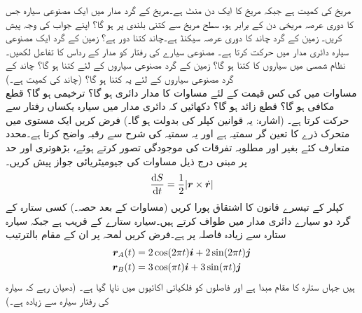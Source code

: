 مریخ کی کمیت  ہے  جبکہ مریخ کا ایک  دن  منٹ  ہے۔مریخ کے گرد مدار میں ایک مصنوعی سیارہ جس کا  دوری عرصہ مریخی دن کے برابر ہو، سطح مریخ سے کتنی بلندی پر ہو گا؟ اپنے جواب کی وجہ پیش کریں۔
زمین کے گرد چاند  کا دوری عرصہ  سیکنڈ  ہے۔چاند کتنا دور ہے؟
زمین کے گرد ایک مصنوعی سیارہ دائری مدار میں حرکت کرتا  ہے۔ مصنوعی سیارے کی رفتار کو مدار کے رداس کا تفاعل لکھیں۔
نظام شمسی میں سیاروں کا  کتنا ہو گا؟ زمین کے گرد مصنوعی سیاروں کے لئے کتنا ہو گا؟ چاند کے گرد مصنوعی سیاروں کے لئے یہ کتنا ہو گا؟ (چاند کی کمیت  ہے۔)
\\
مساوات  میں   کی کس قیمت کے لئے  مساوات  کا مدار دائری ہو گا؟ ترخیمی ہو گا؟ قطع مکافی ہو گا؟ قطع زائد ہو گا؟
دکھائیں کہ دائری مدار میں سیارہ یکساں رفتار سے حرکت کرتا ہے۔ (اشارہ: یہ قوانین کپلر کی بدولت ہو گا۔)
فرض کریں  ایک مستوی میں متحرک ذرے کا تعین گر سمتیہ  ہے اور  یہ  سمتیہ  کی شرح سے رقبہ واضح کرتا ہے۔محدد متعارف کئے بغیر اور مطلوبہ تفرقات  کی موجودگی تصور کرتے ہوئے، بڑھوتری اور حد  پر مبنی  درج ذیل مساوات کی  جیومیٹریائی جواز پیش کریں۔ 
\begin{align*}
\frac{\dif S}{\dif t}=\frac{1}{2}\abs{\kvec{r}\times \dot{\kvec{r}}}
\end{align*}
کپلر کے تیسرے قانون  کا اشتقاق  پورا کریں (مساوات  کے بعد  حصہ۔)
کسی ستارہ کے گرد دو سیارے دائری مدار میں  طواف  کرتے ہیں۔سیارہ  ستارے کے  قریب ہے جبکہ سیارہ ستارہ سے  زیادہ فاصلہ پر ہے۔فرض کریں لمحہ  پر ان کے مقام  بالترتیب 
\begin{align*}
{\ensuremath{{\boldsymbol{r}}}}_A(t)&=2\cos(2\pi t){\boldsymbol{i}}+2\sin(2\pi t){\boldsymbol{j}}\\
{{\boldsymbol{r}}}_B(t)&=3\cos(\pi t){\boldsymbol{i}}+3\sin(\pi t){\boldsymbol{j}}
\end{align*}
ہیں جہاں ستارہ کا مقام مبدا ہے اور فاصلوں کو فلکیاتی اکائیوں میں ناپا گیا ہے۔ (دھیان رہے کہ سیارہ  کی رفتار سیارہ  سے زیادہ ہے۔)

